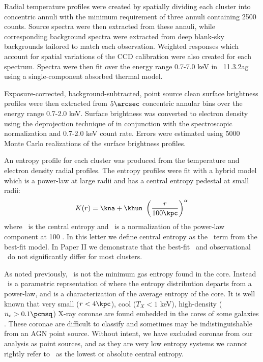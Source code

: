 \documentclass{emulateapj}
\begin{document}
Radial temperature profiles were created by spatially dividing each
cluster into concentric annuli with the minimum requirement of three 
annuli containing 2500 counts. Source spectra were then extracted from
these annuli, while corresponding background spectra were extracted from
deep blank-sky backgrounds tailored to match each
observation. Weighted responses which account for spatial variations
of the CCD calibration were also created for each spectrum. Spectra
were then fit over the energy range 0.7-7.0 keV in \xspec\ 11.3.2ag
using a single-component absorbed thermal model.

Exposure-corrected, background-subtracted, point source clean surface
brightness profiles were then extracted from $5\arcsec$ concentric
annular bins over the energy range 0.7-2.0 keV. Surface brightness was
converted to electron density using the deprojection technique of
\cite{1983ApJ...272..439K} in conjunction with the spectroscopic
normalization and 0.7-2.0 keV count rate. Errors were estimated using
5000 Monte Carlo realizations of the surface brightness profiles.

An entropy profile for each cluster was produced from the temperature
and electron density radial profiles. The entropy profiles were fit
with a hybrid model which is a power-law at large radii and has a
central entropy pedestal at small radii:
\begin{equation}
K(r) = \kna + \khun\ \left(\frac{r}{100 \kpc}\right)^{\alpha} \nonumber \\
\end{equation}
where \kna\ is the central entropy and \khun\ is a normalization of
the power-law component at 100 \kpc. In this letter we define central
entropy as the \kna\ term from the best-fit model. In Paper II we
demonstrate that the best-fit \kna\ and observational \kna\ do not
significantly differ for most clusters.

As noted previously, \kna\ is not the minimum gas entropy found in the
core. Instead \kna\ is a parametric reprsentation of where the entropy
distribution departs from a power-law, and is a characterization of
the average entropy of the core. It is well known that very small ($r
< 4 \kpc$), cool ($T_X < 1$ keV), high-density ($n_e > 0.1 \pcmsq$)
X-ray coronae are found embedded in the cores of some galaxies
\citep{2007ApJ...657..197S}. These coronae are difficult to classify
and sometimes may be indistinguishable from an AGN point
source. Without intent, we have excluded coronae from our analysis as
point sources, and as they are very low entropy systems we cannot
rightly refer to \kna\ as the lowest or absolute central entropy.
\end{document}
